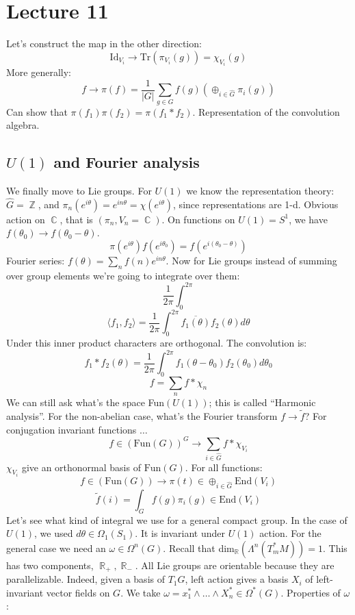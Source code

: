 \documentclass[12 pt]{article}
\DeclareMathOperator {\R} {\mathbb{R}}
\DeclareMathOperator {\C} {\mathbb{C}}
\DeclareMathOperator {\Z} {\mathbb{Z}}
\theoremstyle{plain}
\theoremstyle{definition}
\theoremstyle{remark}
\begin{document}
\section*{Lecture 11}
Let's construct the map in the other direction:
\[           \text{Id}_{V_i}  \to \text{Tr}(\pi_{V_i}(g)) = \chi_{V_i}(g)         \]
More generally:
\[   f \to \pi(f) = \frac{1}{|G|} \sum_{g\in G} f(g) \left( \oplus_{i\in \hat G} \pi_i(g)  \right)  \]
Can show that $\pi(f_1) \pi(f_2) = \pi(f_1 * f_2)$. Representation of the convolution algebra.

\subsection*{$U(1)$ and Fourier analysis}
We finally move to Lie groups. For $U(1)$ we know the representation theory: $\hat G = \Z$, and $\pi_n(e^{i\theta}) = e^{in\theta} = \chi(e^{i\theta})$, since representations are 1-d. Obvious action on $\C$, that is $(\pi_n, V_n = \C)$. On functions on $U(1) = S^1$, we have $f(\theta_0) \to f(\theta_0 - \theta)$.
\[      \pi(e^{i\theta}) f(e^{i\theta_0}) = f(e^{i(\theta_0 - \theta)})     \]
Fourier series: $f(\theta) = \sum_n f(n) e^{in\theta}$. Now for Lie groups instead of summing over group elements we're going to integrate over them:
\[        \frac{1}{2\pi} \int_{0}^{2\pi}      \]
\[       \langle f_1 , f_2  \rangle   =  \frac{1}{2\pi} \int_0^{2\pi} \overline{f_1(\theta)} f_2(\theta)  d\theta \]
Under this inner product characters are orthogonal. The convolution is:
\[    f_1 * f_2 (\theta) = \frac{1}{2\pi} \int_0^{2\pi} f_1(\theta - \theta_0) f_2(\theta_0) d\theta_0    \]
\[        f = \sum_n f*\chi_n    \]
We can still ask what's the space Fun$(U(1))$; this is called ``Harmonic analysis''. For the non-abelian case, what's the Fourier transform $f \to \tilde f$? For conjugation invariant functions $\dots$
\[   f\in (\text{Fun}(G))^G \to \sum_{i\in \hat G} f*\chi_{V_i}   \]
$\chi_{V_i}$ give an orthonormal basis of $\text{Fun}(G)$. For all functions:
\[      f\in (\text{Fun}(G))  \to \pi (t) \in \oplus_{i\in \hat G} \text{End}(V_i)     \]
\[   \tilde f(i) = \int_G f(g) \pi_i(g)     \in \text{End}(V_i)  \]
Let's see what kind of integral we use for a general compact group. In the case of $U(1)$, we used $d\theta \in \Omega_1(S_1)$. It is invariant under $U(1)$ action. For the general case we need an $\omega \in \Omega^n(G)$. Recall that dim$_{\R}(\Lambda^n(T_m^*M)) = 1$. This has two components, $\R_+, \R_-$. All Lie groups are orientable because they are parallelizable. Indeed, given a basis of $T_1G$, left action gives a basis $X_i$ of left-invariant vector fields on $G$. We take $\omega = x_1^* \wedge \dots \wedge X_n^* \in \Omega^*(G)$. Properties of $\omega$:
\end{document}

